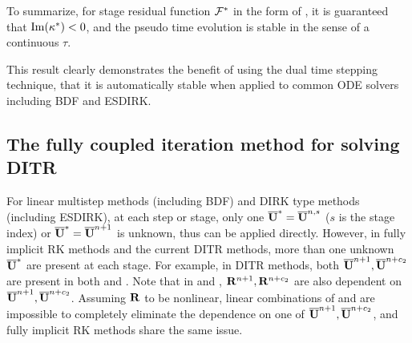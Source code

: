 To summarize, for stage residual function $\mathcal{F}^*$ in the form of
, it is guaranteed that $\mathrm{Im} (\kappa^*) < 0$,
and the pseudo time evolution is stable in the sense of a continuous $\tau$.

This result clearly demonstrates the benefit of using the dual time stepping
technique,
that it is automatically stable when applied to common ODE solvers including
BDF and ESDIRK.


\subsection{The fully coupled iteration method for solving DITR}

For linear multistep methods (including BDF) and DIRK type methods (including ESDIRK),
at each step or stage, only one $\overline{\mathbf{U}}^{*}=\overline{\mathbf{U}}^{n,s}$
($s$ is the stage index) or $\overline{\mathbf{U}}^{*}=\overline{\mathbf{U}}^{n+1}$ is unknown,
thus  can be applied directly.
However, in fully implicit RK methods and the current DITR methods,
more than one unknown $\overline{\mathbf{U}}^{*}$ are present at each stage.
For example, in DITR methods, both $\overline{\mathbf{U}}^{n+1},\overline{\mathbf{U}}^{n+c_2}$
are present in both  and .
Note that in  and ,
$\mathbf{R}^{n+1},\mathbf{R}^{n+c_2}$ are also dependent on $\overline{\mathbf{U}}^{n+1},\overline{\mathbf{U}}^{n+c_2}$.
Assuming $\mathbf{R}$ to be nonlinear, linear combinations of
 and  are
impossible to completely eliminate
the dependence on one of $\overline{\mathbf{U}}^{n+1},\overline{\mathbf{U}}^{n+c_2}$, and
fully implicit RK methods share the same issue.

